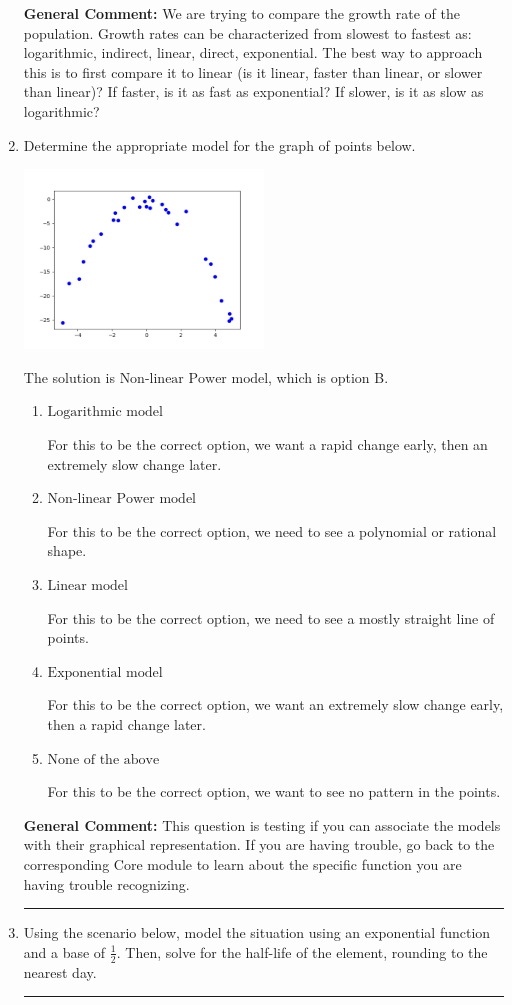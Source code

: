 \documentclass{extbook}[14pt]
\newcommand{\litem}[1]{\item #1

\rule{\textwidth}{0.4pt}}
\begin{document}
\begin{enumerate}
{\textbf{General Comment:} We are trying to compare the growth rate of the population. Growth rates can be characterized from slowest to fastest as: logarithmic, indirect, linear, direct, exponential. The best way to approach this is to first compare it to linear (is it linear, faster than linear, or slower than linear)? If faster, is it as fast as exponential? If slower, is it as slow as logarithmic?
}
\litem{
Determine the appropriate model for the graph of points below.

\begin{center}
    \includegraphics[width=0.5\textwidth]{../Figures/identifyModelGraph11CopyA.png}
\end{center}


The solution is \( \text{Non-linear Power model} \), which is option B.\begin{enumerate}[label=\Alph*.]
\item \( \text{Logarithmic model} \)

For this to be the correct option, we want a rapid change early, then an extremely slow change later.
\item \( \text{Non-linear Power model} \)

For this to be the correct option, we need to see a polynomial or rational shape.
\item \( \text{Linear model} \)

For this to be the correct option, we need to see a mostly straight line of points.
\item \( \text{Exponential model} \)

For this to be the correct option, we want an extremely slow change early, then a rapid change later.
\item \( \text{None of the above} \)

For this to be the correct option, we want to see no pattern in the points.
\end{enumerate}

\textbf{General Comment:} This question is testing if you can associate the models with their graphical representation. If you are having trouble, go back to the corresponding Core module to learn about the specific function you are having trouble recognizing.
}
\litem{
Using the scenario below, model the situation using an exponential function and a base of $\frac{1}{2}$. Then, solve for the half-life of the element, rounding to the nearest day.

}
\end{enumerate}
\end{document}
